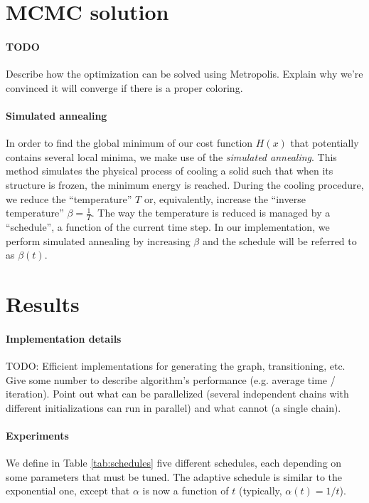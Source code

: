 \documentclass{report}
\begin{document}
  \section*{MCMC solution}
  \paragraph{TODO} Describe how the optimization can be solved using Metropolis. Explain why we're convinced it will converge if there is a proper coloring.

  \paragraph{Simulated annealing}
  In order to find the global minimum of our cost function $H(x)$ that potentially contains several local minima, we make use of the \textit{simulated annealing}. This method simulates the physical process of cooling a solid such that when its structure is frozen, the minimum energy is reached. During the cooling procedure, we reduce the ``temperature'' $T$ or, equivalently, increase the ``inverse temperature'' $\beta=\frac{1}{T}$. The way the temperature is reduced is managed by a ``schedule'', a function of the current time step. In our implementation, we perform simulated annealing by increasing $\beta$ and the schedule will be referred to as $\beta(t)$.

  \section*{Results}
  \paragraph{Implementation details}
  TODO: Efficient implementations for generating the graph, transitioning, etc. Give some number to describe algorithm's performance (e.g. average time / iteration). Point out what can be parallelized (several independent chains with different initializations can run in parallel) and what cannot (a single chain).

  \paragraph{Experiments}  
  We define in Table \ref{tab:schedules} five different schedules, each depending on some parameters that must be tuned. The adaptive schedule is similar to the exponential one, except that $\alpha$ is now a function of $t$ (typically, $\alpha(t) = 1/t$). 
  
\end{document}
